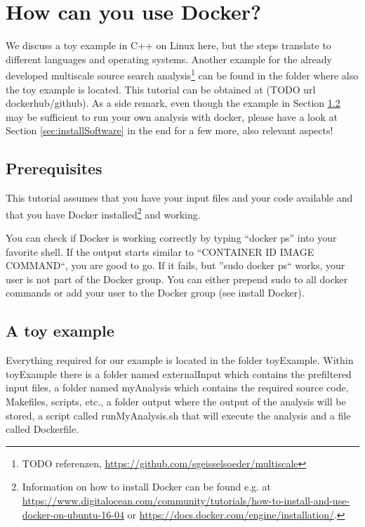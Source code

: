 \documentclass[a4paper, twoside, 11pt]{article}
\begin{document}
\section{How can you use Docker?}

We discuss a toy example in C++ on Linux here, 
but the steps translate to different languages and operating systems. 
Another example for the already developed multiscale source search 
analysis\footnote{TODO referenzen, \url{https://github.com/sgeisselsoeder/multiscale}} 
can be found in the folder where also the toy example is located. 
This tutorial can be obtained at (TODO url dockerhub/github). 
As a side remark, even though the example in Section \ref{sec:toyexample} 
may be sufficient to run your own analysis with docker, 
please have a look at Section \ref{sec:installSoftware} in the end 
for a few more, also relevant aspects!

\subsection{Prerequisites}
\label{sec:isDockerRunning}

This tutorial assumes that you have your input files and your code available and that you have Docker 
installed\footnote{Information on how to install Docker can be found e.g. at 
\url{https://www.digitalocean.com/community/tutorials/how-to-install-and-use-docker-on-ubuntu-16-04} 
or \url{https://docs.docker.com/engine/installation/}.} 
and working. 

You can check if Docker is working correctly by typing ``docker ps'' into your favorite shell. 
If the output starts similar to ``CONTAINER ID \hspace{0.5cm} IMAGE \hspace{0.5cm} COMMAND``, you are good to go. 
If it fails, but ''sudo docker ps`` works, your user is not part of the Docker group. 
You can either prepend sudo to all docker commands or add your user to the Docker group (see install Docker). 

\subsection{A toy example}
\label{sec:toyexample}
Everything required for our example is located in the folder toyExample. 
Within toyExample there is a folder named externalInput which contains the prefiltered input files, 
a folder named myAnalysis which contains the required source code, Makefiles, scripts, etc., 
a folder output where the output of the analysis will be stored, 
a script called runMyAnalysis.sh that will execute the analysis and a file called Dockerfile. 
\end{document}
